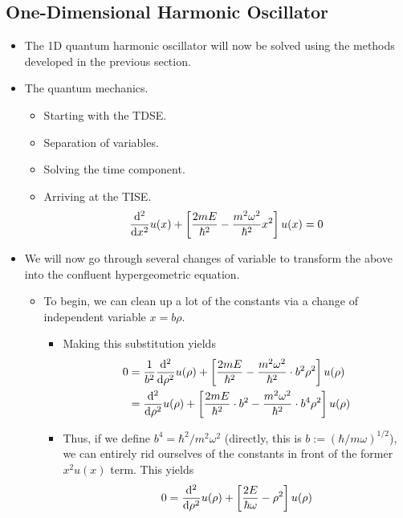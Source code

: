 \documentclass[../finalProject.tex]{subfiles}
\begin{document}
\subsection{One-Dimensional Harmonic Oscillator}
\begin{itemize}
    \item The 1D quantum harmonic oscillator will now be solved using the methods developed in the previous section.
    \item The quantum mechanics.
    \begin{itemize}
        \item Starting with the TDSE.
        \item Separation of variables.
        \item Solving the time component.
        \item Arriving at the TISE.
        \begin{equation*}
            \dv[2]{x}u(x)+\left[ \frac{2mE}{\hbar^2}-\frac{m^2\omega^2}{\hbar^2}x^2 \right]u(x) = 0
        \end{equation*}
    \end{itemize}
    \item We will now go through several changes of variable to transform the above into the confluent hypergeometric equation.
    \begin{itemize}
        \item To begin, we can clean up a lot of the constants via a change of independent variable $x=b\rho$.
        \begin{itemize}
            \item Making this substitution yields
            \begin{align*}
                0 &= \frac{1}{b^2}\dv[2]{\rho}u(\rho)+\left[ \frac{2mE}{\hbar^2}-\frac{m^2\omega^2}{\hbar^2}\cdot b^2\rho^2 \right]u(\rho)\\
                &= \dv[2]{\rho}u(\rho)+\left[ \frac{2mE}{\hbar^2}\cdot b^2-\frac{m^2\omega^2}{\hbar^2}\cdot b^4\rho^2 \right]u(\rho)
            \end{align*}
            \item Thus, if we define $b^4=\hbar^2/m^2\omega^2$ (directly, this is $b:=(\hbar/m\omega)^{1/2}$), we can entirely rid ourselves of the constants in front of the former $x^2u(x)$ term. This yields
            \begin{equation*}
                0 = \dv[2]{\rho}u(\rho)+\left[ \frac{2E}{\hbar\omega}-\rho^2 \right]u(\rho)
            \end{equation*}

\end{itemize}
\end{itemize}
\end{itemize}
\end{document}
